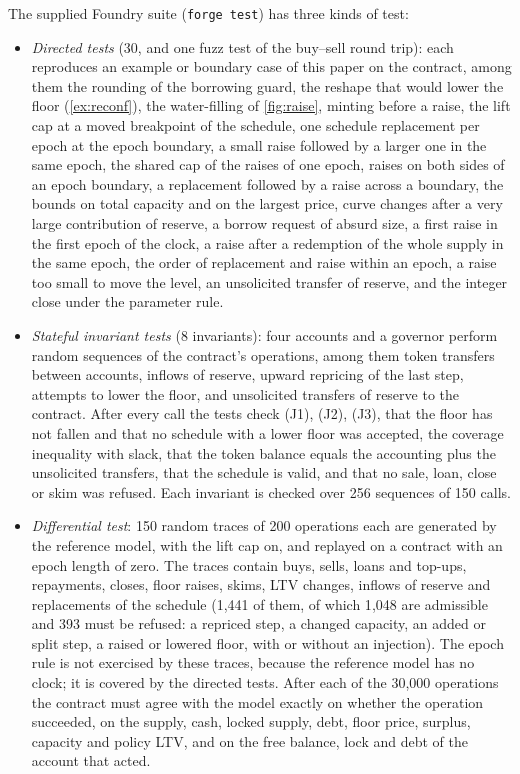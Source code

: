 The supplied Foundry suite (\texttt{forge test}) has three kinds of test:
\begin{itemize}
\item \emph{Directed tests} (30, and one fuzz test of the buy--sell round trip): each reproduces an example or boundary case of this paper on the contract, among them the rounding of the borrowing guard, the reshape that would lower the floor (\cref{ex:reconf}), the water-filling of \cref{fig:raise}, minting before a raise, the lift cap at a moved breakpoint of the schedule, one schedule replacement per epoch at the epoch boundary, a small raise followed by a larger one in the same epoch, the shared cap of the raises of one epoch, raises on both sides of an epoch boundary, a replacement followed by a raise across a boundary, the bounds on total capacity and on the largest price, curve changes after a very large contribution of reserve, a borrow request of absurd size, a first raise in the first epoch of the clock, a raise after a redemption of the whole supply in the same epoch, the order of replacement and raise within an epoch, a raise too small to move the level, an unsolicited transfer of reserve, and the integer close under the parameter rule.
\item \emph{Stateful invariant tests} (8 invariants): four accounts and a governor perform random sequences of the contract's operations, among them token transfers between accounts, inflows of reserve, upward repricing of the last step, attempts to lower the floor, and unsolicited transfers of reserve to the contract. After every call the tests check (J1), (J2), (J3), that the floor has not fallen and that no schedule with a lower floor was accepted, the coverage inequality with slack, that the token balance equals the accounting plus the unsolicited transfers, that the schedule is valid, and that no sale, loan, close or skim was refused. Each invariant is checked over 256 sequences of 150 calls.
\item \emph{Differential test}: 150 random traces of 200 operations each are generated by the reference model, with the lift cap on, and replayed on a contract with an epoch length of zero. The traces contain buys, sells, loans and top-ups, repayments, closes, floor raises, skims, LTV changes, inflows of reserve and replacements of the schedule (1{,}441 of them, of which 1{,}048 are admissible and 393 must be refused: a repriced step, a changed capacity, an added or split step, a raised or lowered floor, with or without an injection). The epoch rule is not exercised by these traces, because the reference model has no clock; it is covered by the directed tests. After each of the 30{,}000 operations the contract must agree with the model exactly on whether the operation succeeded, on the supply, cash, locked supply, debt, floor price, surplus, capacity and policy LTV, and on the free balance, lock and debt of the account that acted.
\end{itemize}

